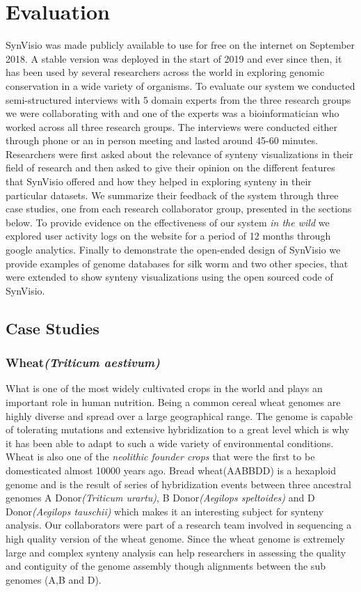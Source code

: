 \chapter{Evaluation}

SynVisio was made publicly available to use for free on the internet on September 2018. A stable version was deployed in the start of 2019 and ever since then, it has been used by several researchers across the world in exploring genomic conservation in a wide variety of organisms. To evaluate our system we conducted semi-structured interviews with 5 domain experts from the three research groups we were collaborating with and one of the experts was a bioinformatician who worked across all three research groups. The interviews were conducted either through phone or an in person meeting and lasted around 45-60 minutes. Researchers were first asked about the relevance of synteny visualizations in their field of research and then asked to give their opinion on the different features that SynVisio offered and how they helped in exploring synteny in their particular datasets. We summarize their feedback of the system through three case studies, one from each research collaborator group, presented in the sections below. To provide evidence on the effectiveness of our system \textit{in the wild} we explored user activity logs on the website for a period of 12 months through google analytics. Finally to demonstrate the open-ended design of SynVisio we provide examples of genome databases for silk worm and two other species, that were extended to show synteny visualizations using the open sourced code of SynVisio.

\section{Case Studies}

\subsection{Wheat\textit{(Triticum aestivum)}}
What is one of the most widely cultivated crops in the world and plays an important role in human nutrition. Being a common cereal wheat genomes are highly diverse and spread over a large geographical range. The genome is capable of tolerating mutations and extensive hybridization to a great level which is why it has been able to adapt to such a wide variety of environmental conditions\cite{wheatinfo,10wheat}. Wheat is also one of the \textit{neolithic founder crops} that were the first to be domesticated almost 10000 years ago.
Bread wheat(AABBDD) is a hexaploid genome and is the result of series of hybridization events between three ancestral genomes A Donor\textit{(Triticum urartu)}, B Donor\textit{(Aegilops speltoides)} and D Donor\textit{(Aegilops tauschii)} which makes it an interesting subject for synteny analysis. Our collaborators were part of a research team involved in sequencing a high quality version of the wheat genome. Since the wheat genome is extremely large and complex synteny analysis can help researchers in assessing the quality and contiguity of the genome assembly though alignments between the sub genomes (A,B and D).

